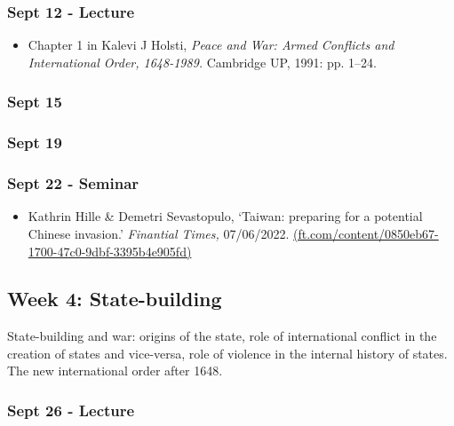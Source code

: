 \documentclass[12pt, a4paper]{article}
\begin{document}
\subsubsection*{Sept 12 - Lecture}

\begin{itemize}
\setlength\itemsep{0pt}
\item Chapter 1 in Kalevi J Holsti, \textit{Peace and War: Armed Conflicts and International Order, 1648-1989.} Cambridge UP, 1991: pp. 1--24.
\end{itemize}

\subsubsection*{Sept 15 {}}

\subsubsection*{Sept 19 {}}

\subsubsection*{Sept 22 - Seminar}

\begin{itemize}
\setlength\itemsep{0pt}
\item Kathrin Hille \& Demetri Sevastopulo, `Taiwan: preparing for a potential Chinese invasion.' \textit{Finantial Times,} 07/06/2022. \href{https://www.ft.com/content/0850eb67-1700-47c0-9dbf-3395b4e905fd}{(ft.com/content/0850eb67-1700-47c0-9dbf-3395b4e905fd)}
\end{itemize}

\hline %

\subsection*{Week 4: State-building}

State-building and war: origins of the state, role of international conflict in the creation of states and vice-versa, role of violence in the internal history of states. The new international order after 1648.

\subsubsection*{Sept 26 - Lecture}
\end{document}
